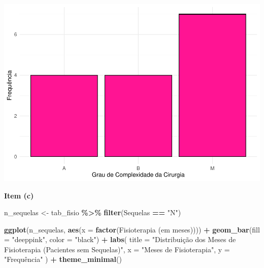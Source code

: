 \documentclass[
]{book}
\newenvironment{Shaded}{\begin{snugshade}}{\end{snugshade}}
\newcommand{\AttributeTok}[1]{\textcolor[rgb]{0.13,0.29,0.53}{#1}}
\newcommand{\FunctionTok}[1]{\textcolor[rgb]{0.13,0.29,0.53}{\textbf{#1}}}
\newcommand{\NormalTok}[1]{#1}
\newcommand{\OtherTok}[1]{\textcolor[rgb]{0.56,0.35,0.01}{#1}}
\newcommand{\SpecialCharTok}[1]{\textcolor[rgb]{0.81,0.36,0.00}{\textbf{#1}}}
\newcommand{\StringTok}[1]{\textcolor[rgb]{0.31,0.60,0.02}{#1}}
\begin{document}
\begin{center}\includegraphics{AED_files/figure-latex/cap6_ex1bc-1} \end{center}

\textbf{Item (c)}

\begin{Shaded}
\begin{Highlighting}[]
\NormalTok{n\_sequelas }\OtherTok{\textless{}{-}}\NormalTok{ tab\_fisio }\SpecialCharTok{\%\textgreater{}\%}
  \FunctionTok{filter}\NormalTok{(Sequelas }\SpecialCharTok{==} \StringTok{"N"}\NormalTok{)}

\FunctionTok{ggplot}\NormalTok{(n\_sequelas, }\FunctionTok{aes}\NormalTok{(}\AttributeTok{x =} \FunctionTok{factor}\NormalTok{(}\StringTok{\textasciigrave{}}\AttributeTok{Fisioterapia (em meses)}\StringTok{\textasciigrave{}}\NormalTok{))) }\SpecialCharTok{+}
  \FunctionTok{geom\_bar}\NormalTok{(}\AttributeTok{fill =} \StringTok{"deeppink"}\NormalTok{, }\AttributeTok{color =} \StringTok{"black"}\NormalTok{) }\SpecialCharTok{+}
  \FunctionTok{labs}\NormalTok{(}
    \AttributeTok{title =} \StringTok{"Distribuição dos Meses de Fisioterapia (Pacientes sem Sequelas)"}\NormalTok{,}
    \AttributeTok{x =} \StringTok{"Meses de Fisioterapia"}\NormalTok{,}
    \AttributeTok{y =} \StringTok{"Frequência"}
\NormalTok{  ) }\SpecialCharTok{+}
  \FunctionTok{theme\_minimal}\NormalTok{()}
\end{Highlighting}
\end{Shaded}
\end{document}
